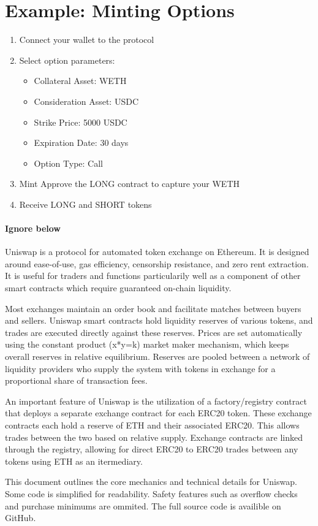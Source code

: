   \section{Example: Minting Options}

  \begin{enumerate}
  \item
    Connect your wallet to the protocol
  \item
    Select option parameters:
    \begin{itemize}
    \item
      Collateral Asset: WETH
    \item
      Consideration Asset: USDC
    \item
      Strike Price: 5000 USDC
    \item
      Expiration Date: 30 days
    \item
      Option Type: Call
    \end{itemize}
  \item
    Mint Approve the LONG contract to capture your WETH
  \item
    Receive LONG and SHORT tokens
  \end{enumerate}
  
\paragraph*{Ignore below}

Uniswap is a protocol for automated token exchange on Ethereum. 
It is designed around ease-of-use, gas efficiency, censorship resistance, and zero rent extraction. 
It is useful for traders and functions particularily well as a component of other smart contracts which require guaranteed on-chain liquidity.

Most exchanges maintain an order book and facilitate matches between buyers and sellers. 
Uniswap smart contracts hold liquidity reserves of various tokens, 
and trades are executed directly against these reserves. 
Prices are set automatically using the constant product (x*y=k) market maker mechanism, which keeps overall reserves in relative equilibrium. 
Reserves are pooled between a network of liquidity providers who supply the system with tokens in exchange for a proportional share of transaction fees.

An important feature of Uniswap is the utilization of a factory/registry contract that deploys a separate exchange contract for each ERC20 token. These exchange contracts each hold a reserve of ETH and their associated ERC20. This allows trades between the two based on relative supply. Exchange contracts are linked through the registry, allowing for direct ERC20 to ERC20 trades between any tokens using ETH as an itermediary.

This document outlines the core mechanics and technical details for Uniswap. Some code is simplified for readability. Safety features such as overflow checks and purchase minimums are ommited. The full source code is availible on GitHub.

